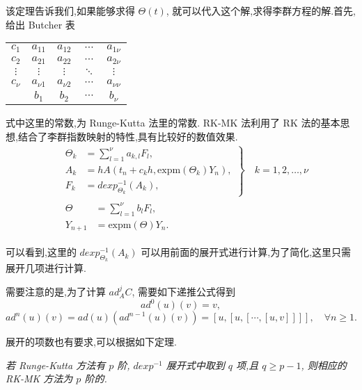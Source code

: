 该定理告诉我们,如果能够求得 $\Theta(t)$, 就可以代入这个解,求得李群方程的解.首先,给出 Butcher 表
\begin{center}
  \begin{tabular}{c|cccc}
    $c_1$&$a_{11}$&$a_{12}$&$\cdots$&$a_{1\nu}$\\
    $c_2$&$a_{21}$&$a_{22}$&$\cdots$&$a_{2\nu}$\\
    $\vdots$&$\vdots$&$\vdots$&$\ddots$&$\vdots$\\
    $c_{\nu}$&$a_{\nu 1}$&$a_{\nu 2}$&$\cdots$&$a_{\nu \nu}$\\
    \hline
         &$b_{1}$&$b_{2}$&$\cdots$&$b_{\nu}$
  \end{tabular}
\end{center}
式中这里的常数,为 Runge-Kutta 法里的常数. RK-MK 法利用了 RK 法的基本思想,结合了李群指数映射的特性,具有比较好的数值效果.
\begin{equation*}
	\begin{aligned}
		&\left.\begin{aligned}
		\Theta_k&=\sum_{l=1}^{\nu}a_{k,l}F_l,\\
		A_k&=hA(t_n+c_kh,\mbox{expm}(\Theta_k)Y_n),\\
		F_k&=dexp_{\Theta_k}^{-1}(A_k),
	\end{aligned}\right\rbrace \quad k=1,2,\ldots,\nu\\
		&\begin{aligned}
		\Theta&=\sum_{l=1}^{\nu}b_lF_l,\\
		Y_{n+1}&=\mbox{expm}(\Theta)Y_n.
	\end{aligned}
	\end{aligned}
\end{equation*}

可以看到,这里的 $dexp_{\Theta_k}^{-1}(A_k)$ 可以用前面的展开式进行计算,为了简化,这里只需展开几项进行计算.

需要注意的是,为了计算 $ad^j_AC$, 需要如下递推公式得到
\begin{equation*}
	ad^0(u)(v)=v,
\end{equation*}
\begin{equation*}
	ad^n(u)(v)=ad(u)(ad^{n-1}(u)(v))=[u,[u,[\cdots,[u,v]]]],\quad \forall n \geq 1.
\end{equation*}

展开的项数也有要求,可以根据如下定理.
\begin{theorem}
	\emph{若 Runge-Kutta 方法有 $p$ 阶, $dexp^{-1}$ 展开式中取到 $q$ 项,且 $q\geq p-1$, 则相应的 RK-MK 方法为 $p$ 阶的.}
\end{theorem}

